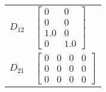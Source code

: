 \begin{tabular}{cl}
 $D_{12}$ & $\left[\begin{matrix}0 & 0\\0 & 0\\1.0 & 0\\0 & 1.0\end{matrix}\right]$                                                                                               \\
 $D_{21}$ & $\left[\begin{matrix}0 & 0 & 0 & 0\\0 & 0 & 0 & 0\\0 & 0 & 0 & 0\end{matrix}\right]$                                                                                  \\
\hline
\end{tabular}